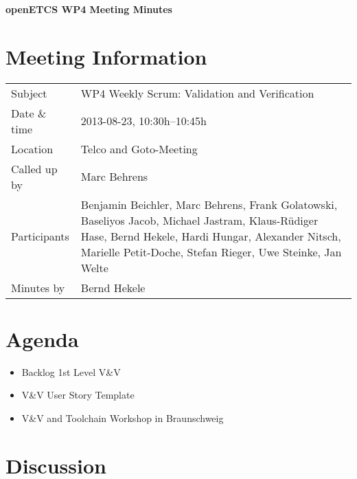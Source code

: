 \documentclass[a4paper, 11pt]{article}
\begin{document}
{\begin{center}\huge\bf openETCS WP4 Meeting Minutes\end{center}}
\section{Meeting Information}

\renewcommand{\arraystretch}{1.5}
\begin{supertabular}{m{.2\textwidth}m{.8\textwidth}}
Subject & WP4 Weekly Scrum: Validation and Verification\\
Date \& time & 2013-08-23, 10:30h--10:45h\\
Location & Telco and Goto-Meeting\\
Called up by & Marc Behrens\\
Participants &
Benjamin Beichler,
Marc Behrens,
Frank Golatowski,
Baseliyos Jacob,
Michael Jastram,
Klaus-R\"udiger Hase,
Bernd Hekele,
Hardi Hungar,
Alexander Nitsch,
Marielle Petit-Doche,
Stefan Rieger,
Uwe Steinke,
Jan Welte
\\

Minutes by & Bernd Hekele\\

\end{supertabular}
\renewcommand{\arraystretch}{1.0}


\section{{Agenda}}
\begin{itemize}
\item Backlog 1st Level V\&V
\item V\&V User Story Template
\item V\&V and Toolchain Workshop in Braunschweig
\end{itemize}

\section{Discussion}
\end{document}
